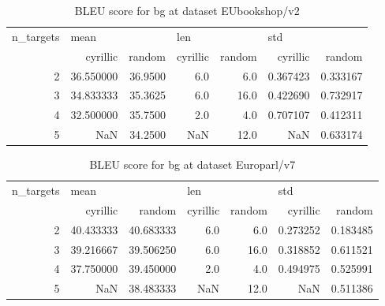 \begin{table}[h]
\begin{tabular}{rrrrrrr}
\toprule
n\_targets & \multicolumn{2}{l}{mean} & \multicolumn{2}{l}{len} & \multicolumn{2}{l}{std} \\
          &   cyrillic &   random & cyrillic & random &  cyrillic &    random \\
\midrule
        2 &  36.550000 &  36.9500 &      6.0 &    6.0 &  0.367423 &  0.333167 \\
        3 &  34.833333 &  35.3625 &      6.0 &   16.0 &  0.422690 &  0.732917 \\
        4 &  32.500000 &  35.7500 &      2.0 &    4.0 &  0.707107 &  0.412311 \\
        5 &        NaN &  34.2500 &      NaN &   12.0 &       NaN &  0.633174 \\
\bottomrule
\end{tabular}

\caption{BLEU score for  bg at dataset EUbookshop/v2 }
\label{ table:bg/EUbookshop/v2 }
\end{table}

\begin{table}[h]
\begin{tabular}{rrrrrrr}
\toprule
n\_targets & \multicolumn{2}{l}{mean} & \multicolumn{2}{l}{len} & \multicolumn{2}{l}{std} \\
          &   cyrillic &     random & cyrillic & random &  cyrillic &    random \\
\midrule
        2 &  40.433333 &  40.683333 &      6.0 &    6.0 &  0.273252 &  0.183485 \\
        3 &  39.216667 &  39.506250 &      6.0 &   16.0 &  0.318852 &  0.611521 \\
        4 &  37.750000 &  39.450000 &      2.0 &    4.0 &  0.494975 &  0.525991 \\
        5 &        NaN &  38.483333 &      NaN &   12.0 &       NaN &  0.511386 \\
\bottomrule
\end{tabular}

\caption{BLEU score for  bg at dataset Europarl/v7 }
\label{ table:bg/Europarl/v7 }
\end{table}

